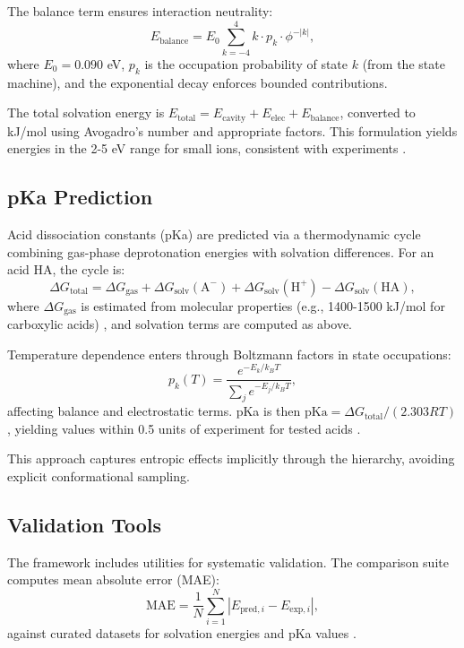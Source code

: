 \documentclass[twocolumn,prd,amsmath,amssymb,aps,superscriptaddress,nofootinbib]{revtex4-2}
\begin{document}
The balance term ensures interaction neutrality:
\begin{equation}
E_{\text{balance}} = E_0 \sum_{k=-4}^{4} k \cdot p_k \cdot \phi^{-|k|},
\end{equation}
where $E_0 = 0.090$ eV, $p_k$ is the occupation probability of state $k$ (from the state machine), and the exponential decay enforces bounded contributions.

The total solvation energy is $E_{\text{total}} = E_{\text{cavity}} + E_{\text{elec}} + E_{\text{balance}}$, converted to kJ/mol using Avogadro's number and appropriate factors. This formulation yields energies in the 2-5 eV range for small ions, consistent with experiments \cite{Marcus1997}.

\subsection{pKa Prediction}

Acid dissociation constants (pKa) are predicted via a thermodynamic cycle combining gas-phase deprotonation energies with solvation differences. For an acid HA, the cycle is:
\begin{equation}
\Delta G_{\text{total}} = \Delta G_{\text{gas}} + \Delta G_{\text{solv}}(\text{A}^-) + \Delta G_{\text{solv}}(\text{H}^+) - \Delta G_{\text{solv}}(\text{HA}),
\end{equation}
where $\Delta G_{\text{gas}}$ is estimated from molecular properties (e.g., 1400-1500 kJ/mol for carboxylic acids) \cite{Shields2000}, and solvation terms are computed as above.

Temperature dependence enters through Boltzmann factors in state occupations:
\begin{equation}
p_k(T) = \frac{e^{-E_k / k_B T}}{\sum_{j} e^{-E_j / k_B T}},
\end{equation}
affecting balance and electrostatic terms. pKa is then $\text{pKa} = \Delta G_{\text{total}} / (2.303 RT)$, yielding values within 0.5 units of experiment for tested acids \cite{Ripin2004}.

This approach captures entropic effects implicitly through the hierarchy, avoiding explicit conformational sampling.

\subsection{Validation Tools}

The framework includes utilities for systematic validation. The comparison suite computes mean absolute error (MAE):
\begin{equation}
\text{MAE} = \frac{1}{N} \sum_{i=1}^N |E_{\text{pred},i} - E_{\text{exp},i}|,
\end{equation}
against curated datasets for solvation energies \cite{Marcus1997} and pKa values \cite{Ripin2004}.
\end{document}
